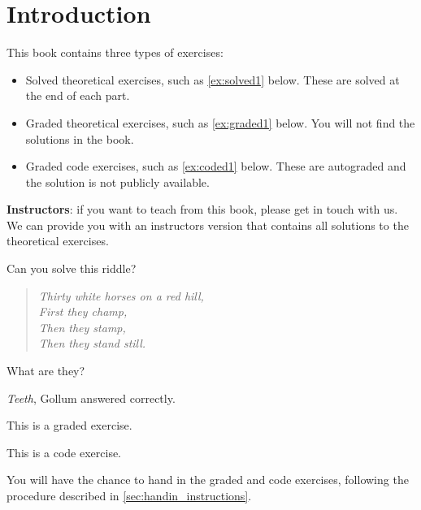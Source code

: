 
\section{Introduction}

This book contains three types of exercises:

\begin{itemize}

    \item Solved theoretical exercises, such as \cref{ex:solved1} below.
          These are solved at the end of each part.
    \item Graded theoretical exercises, such as \cref{ex:graded1} below.
          You will not find the solutions in the book.
    \item Graded code exercises, such as \cref{ex:coded1} below.
          These are autograded and the solution is not publicly available.
\end{itemize}

\begin{remark}
    \textbf{Instructors}: if you want to teach from this book, please get in touch with us.
    We can provide you with an instructors version that contains all solutions to the theoretical exercises.
\end{remark}

\begin{exercise}
    \label{ex:solved1}
    Can you solve this riddle?
    \begin{quote}
        \itshape%
        Thirty white horses on a red hill,\\
        First they champ,\\
        Then they stamp,\\
        Then they stand still.
    \end{quote}
    What are they?
\end{exercise}
\begin{solution}
    \emph{Teeth}, Gollum answered correctly.
\end{solution}

\begin{gradedexercise}
    \label{ex:graded1}
    This is a graded exercise.
\end{gradedexercise}

\begin{codeexercise}
    \label{ex:coded1}
    This is a code exercise.
\end{codeexercise}

You will have the chance to hand in the graded and code exercises, following the procedure described in \cref{sec:handin_instructions}.
